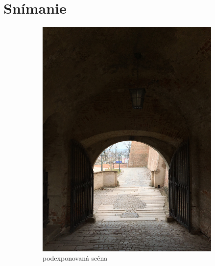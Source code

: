\section{Snímanie}

\begin{figure}[t]
    \centering
    \begin{subfigure}{0.3\textwidth}
        \includegraphics[width=\textwidth]{figures/capturing/exposures/underexposed}
        \caption{podexponovaná scéna}
        \label{fig:underexposed}
    \end{subfigure}
    ~
    \begin{subfigure}{0.3\textwidth}

\end{subfigure}
\end{figure}
